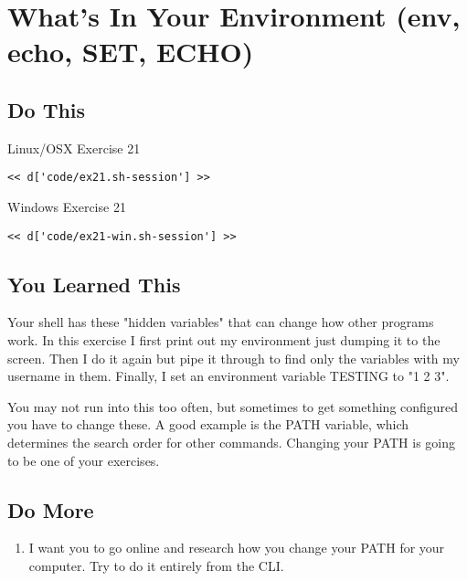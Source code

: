 \chapter{What's In Your Environment (env, echo, SET, ECHO)}

\section{Do This}

\begin{code}{Linux/OSX Exercise 21}
\begin{Verbatim}
<< d['code/ex21.sh-session'] >>
\end{Verbatim}
\end{code}

\begin{code}{Windows Exercise 21}
\begin{Verbatim}
<< d['code/ex21-win.sh-session'] >>
\end{Verbatim}
\end{code}

\section{You Learned This}

Your shell has these "hidden variables" that can change how other programs work.
In this exercise I first print out my environment just dumping it to the screen.
Then I do it again but pipe it through  to find only the variables
with my username in them.  Finally, I set an environment variable TESTING to "1 2 3".

You may not run into this too often, but sometimes to get something configured
you have to change these.  A good example is the PATH variable, which determines
the search order for other commands.  Changing your PATH is going to be one
of your exercises.


\section{Do More}

\begin{enumerate}
\item I want you to go online and research how you change your PATH for your computer.  Try to do it entirely from the CLI.
\end{enumerate}

